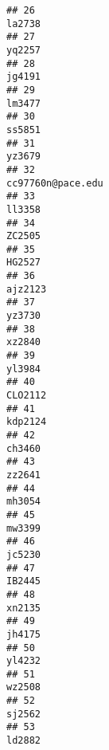 \documentclass[]{article}
\begin{document}
\begin{verbatim}
## 26                                                                                    la2738
## 27                                                                                    yq2257
## 28                                                                                    jg4191
## 29                                                                                    lm3477
## 30                                                                                    ss5851
## 31                                                                                    yz3679
## 32                                                                         cc97760n@pace.edu
## 33                                                                                    ll3358
## 34                                                                                    ZC2505
## 35                                                                                    HG2527
## 36                                                                                   ajz2123
## 37                                                                                    yz3730
## 38                                                                                    xz2840
## 39                                                                                    yl3984
## 40                                                                                   CLO2112
## 41                                                                                   kdp2124
## 42                                                                                    ch3460
## 43                                                                                    zz2641
## 44                                                                                    mh3054
## 45                                                                                    mw3399
## 46                                                                                    jc5230
## 47                                                                                    IB2445
## 48                                                                                    xn2135
## 49                                                                                    jh4175
## 50                                                                                    yl4232
## 51                                                                                    wz2508
## 52                                                                                    sj2562
## 53                                                                                    ld2882

\end{verbatim}
\end{document}
